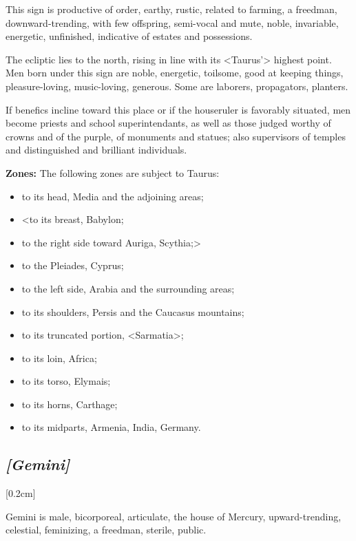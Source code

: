 This sign is productive of order,  earthy, rustic, related to farming, a freedman, downward-trending, with few offspring,  semi-vocal and  mute, noble, invariable, energetic, unfinished, indicative of estates and possessions. 

The ecliptic lies to the north, rising in line with its <Taurus’> highest point. Men born under this sign are noble, energetic, toilsome, good at keeping things, pleasure-loving, music-loving, generous. Some are laborers, propagators, planters. 

If benefics incline toward this place or if the houseruler is favorably situated, men become priests and school superintendants, as well as those judged worthy of crowns and of the purple, of monuments and statues; also supervisors of temples and distinguished and brilliant individuals.

\textbf{Zones:} The following zones are subject to Taurus: 
\begin{itemize}
\item to its head, Media and the adjoining areas; 
\item <to its breast, Babylon; 
\item to the right side toward Auriga, Scythia;> 
\item to the Pleiades, Cyprus; 
\item to the left side, Arabia and the surrounding areas; 
\item to its shoulders, Persis and the Caucasus mountains; 
\item to its truncated portion, <Sarmatia>; 
\item to its loin, Africa; 
\item to its torso, Elymais; 
\item to its horns, Carthage; 
\item to its midparts, Armenia, India, Germany.
\end{itemize}

\secbr
\subsection{\textit{[Gemini]}}
[0.2cm]

 Gemini is  male,  bicorporeal, articulate, the house of Mercury, upward-trending, celestial, feminizing, a freedman,  sterile, public. 

